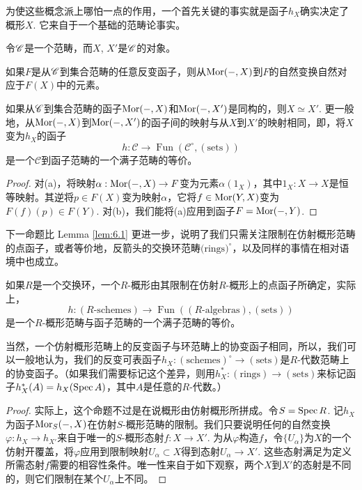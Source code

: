 为使这些概念派上哪怕一点的作用，一个首先关键的事实就是函子$h_X$确实决定了概形$X$. 它来自于一个基础的范畴论事实。

\begin{lem}[Yoneda引理]\label{lem:6.1}
令$\mathscr{C}$是一个范畴，而$X$, $X'$是$\mathscr{C}$的对象。
\begin{compactenum}[(\rm a)]
\item 如果$F$是从$\mathscr{C}$到集合范畴的任意反变函子，则从$\operatorname{Mor}(-,X)$到$F$的自然变换自然对应于$F(X)$中的元素。
\item 如果从$\mathscr{C}$到集合范畴的函子$\operatorname{Mor}(-,X)$和$\operatorname{Mor}(-,X')$是同构的，则$X\simeq X'$. 更一般地，从$\operatorname{Mor}(-,X)$到$\operatorname{Mor}(-,X')$的函子间的映射与从$X$到$X'$的映射相同，即，将$X$变为$h_X$的函子
\[
	h:\mathscr C\to \operatorname{Fun}(\mathscr C^\circ,(\text{sets}))
\]
是一个$\mathscr C$到函子范畴的一个满子范畴的等价。
\end{compactenum}
\end{lem}

\begin{proof}
对(a)，将映射$\alpha:\operatorname{Mor}(-,X)\to F$变为元素$\alpha(1_X)$，其中$1_X:X\to X$是恒等映射。其逆将$p\in F(X)$变为映射$\alpha$，它将$f\in \operatorname{Mor}(Y,X)$变为$F(f)(p)\in F(Y)$. 对(b)，我们能将(a)应用到函子$F=\operatorname{Mor}(-,Y)$.
\end{proof}

下一命题比 Lemma \ref{lem:6.1} 更进一步，说明了我们只需关注限制在仿射概形范畴的点函子，或者等价地，反箭头的交换环范畴$\text{(rings)}^\circ$，以及同样的事情在相对语境中也成立。

\begin{pro}\label{pro:6.2}
如果$R$是一个交换环，一个$R$-概形由其限制在仿射$R$-概形上的点函子所确定，实际上，
\[
	h:(\text{$R$-schemes})\to \operatorname{Fun}((\text{$R$-algebras}),(\text{sets}))
\]
是一个$R$-概形范畴与函子范畴的一个满子范畴的等价。
\end{pro}

当然，一个仿射概形范畴上的反变函子与环范畴上的协变函子相同，所以，我们可以一般地认为，我们的反变可表函子$h_X:(\text{schemes})^\circ \to (\text{sets})$是$R$-代数范畴上的协变函子。（如果我们需要标记这个差异，则用$h_X^*:(\text{rings})\to (\text{sets})$来标记函子$h_X^*(A)=h_X(\operatorname{Spec} A)$，其中$A$是任意的$R$-代数。）

\begin{proof}
实际上，这个命题不过是在说概形由仿射概形所拼成。令$S=\operatorname{Spec} R$. 记$h_X$为函子$\operatorname{Mor}_S(-,X)$在仿射$S$-概形范畴的限制。我们只要说明任何的自然变换$\varphi:h_X\to h_{X'}$来自于唯一的$S$-概形态射$f:X\to X'$. 为从$\varphi$构造$f$，令$\{U_\alpha\}$为$X$的一个仿射开覆盖，将$\varphi$应用到限制映射$U_\alpha\subset X$得到态射$U_\alpha\to X'$. 这些态射满足为定义所需态射$f$需要的相容性条件。唯一性来自于如下观察，两个$X$到$X'$的态射是不同的，则它们限制在某个$U_\alpha$上不同。
\end{proof}

